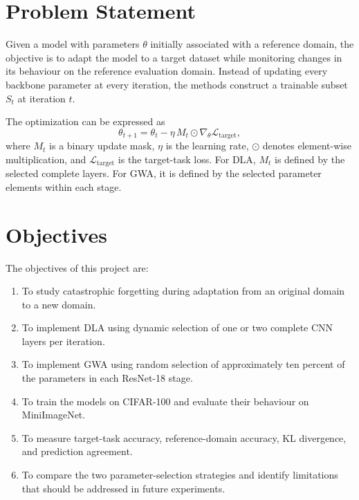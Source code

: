 \documentclass[12pt,a4paper]{report}
\begin{document}
\section{Problem Statement}
Given a model with parameters $\theta$ initially associated with a
reference domain, the objective is to adapt the model to a target dataset
while monitoring changes in its behaviour on the reference evaluation
domain. Instead of updating every backbone parameter at every iteration,
the methods construct a trainable subset $S_t$ at iteration $t$.

The optimization can be expressed as
\[
\theta_{t+1} =
\theta_t - \eta\, M_t \odot \nabla_{\theta}\mathcal{L}_{\mathrm{target}},
\]
where $M_t$ is a binary update mask, $\eta$ is the learning rate,
$\odot$ denotes element-wise multiplication, and
$\mathcal{L}_{\mathrm{target}}$ is the target-task loss. For DLA,
$M_t$ is defined by the selected complete layers. For GWA, it is
defined by the selected parameter elements within each stage.

\section{Objectives}
The objectives of this project are:
\begin{enumerate}
    \item To study catastrophic forgetting during adaptation from an
    original domain to a new domain.
    \item To implement DLA using dynamic selection of one or two
    complete CNN layers per iteration.
    \item To implement GWA using random selection of approximately
    ten percent of the parameters in each ResNet-18 stage.
    \item To train the models on CIFAR-100 and evaluate their behaviour
    on MiniImageNet.
    \item To measure target-task accuracy, reference-domain accuracy,
    KL divergence, and prediction agreement.
    \item To compare the two parameter-selection strategies and identify
    limitations that should be addressed in future experiments.
\end{enumerate}
\end{document}
